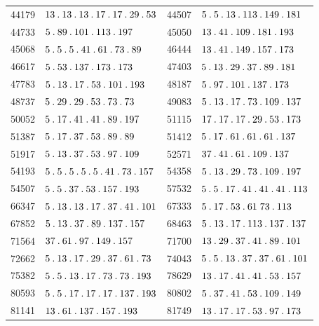 \begin{longtable}{@{}r|l@{\qquad}r|l@{}}
44179 & $13\pdot 13\pdot 13\pdot 17\pdot 17\pdot 29\pdot 53$ & 44507 & $5\pdot 5\pdot 13\pdot 113\pdot 149\pdot 181$\\
44733 & $5\pdot 89\pdot 101\pdot 113\pdot 197$ & 45050 & $13\pdot 41\pdot 109\pdot 181\pdot 193$\\
45068 & $5\pdot 5\pdot 5\pdot 41\pdot 61\pdot 73\pdot 89$ & 46444 & $13\pdot 41\pdot 149\pdot 157\pdot 173$\\
46617 & $5\pdot 53\pdot 137\pdot 173\pdot 173$ & 47403 & $5\pdot 13\pdot 29\pdot 37\pdot 89\pdot 181$\\
47783 & $5\pdot 13\pdot 17\pdot 53\pdot 101\pdot 193$ & 48187 & $5\pdot 97\pdot 101\pdot 137\pdot 173$\\
48737 & $5\pdot 29\pdot 29\pdot 53\pdot 73\pdot 73$ & 49083 & $5\pdot 13\pdot 17\pdot 73\pdot 109\pdot 137$\\
50052 & $5\pdot 17\pdot 41\pdot 41\pdot 89\pdot 197$ & 51115 & $17\pdot 17\pdot 17\pdot 29\pdot 53\pdot 173$\\
51387 & $5\pdot 17\pdot 37\pdot 53\pdot 89\pdot 89$ & 51412 & $5\pdot 17\pdot 61\pdot 61\pdot 61\pdot 137$\\
51917 & $5\pdot 13\pdot 37\pdot 53\pdot 97\pdot 109$ & 52571 & $37\pdot 41\pdot 61\pdot 109\pdot 137$\\
54193 & $5\pdot 5\pdot 5\pdot 5\pdot 5\pdot 41\pdot 73\pdot 157$ & 54358 & $5\pdot 13\pdot 29\pdot 73\pdot 109\pdot 197$\\
54507 & $5\pdot 5\pdot 37\pdot 53\pdot 157\pdot 193$ & 57532 & $5\pdot 5\pdot 17\pdot 41\pdot 41\pdot 41\pdot 113$\\
66347 & $5\pdot 13\pdot 13\pdot 17\pdot 37\pdot 41\pdot 101$ & 67333 & $5\pdot 17\pdot 53\pdot 61\;73\pdot 113$\\
67852 & $5\pdot 13\pdot 37\pdot 89\pdot 137\pdot 157$ & 68463 & $5\pdot 13\pdot 17\pdot 113\pdot 137\pdot 137$\\
71564 & $37\pdot 61\pdot 97\pdot 149\pdot 157$ & 71700 & $13\pdot 29\pdot 37\pdot 41\pdot 89\pdot 101$\\
72662 & $5\pdot 13\pdot 17\pdot 29\pdot 37\pdot 61\pdot 73$ & 74043 & $5\pdot 5\pdot 13\pdot 37\pdot 37\pdot 61\pdot 101$\\
75382 & $5\pdot 5\pdot 13\pdot 17\pdot 73\pdot 73\pdot 193$ & 78629 & $13\pdot 17\pdot 41\pdot 41\pdot 53\pdot 157$\\
80593 & $5\pdot 5\pdot 17\pdot 17\pdot 17\pdot 137\pdot 193$ & 80802 & $5\pdot 37\pdot 41\pdot 53\pdot 109\pdot 149$\\
81141 & $13\pdot 61\pdot 137\pdot 157\pdot 193$ & 81749 & $13\pdot 17\pdot 17\pdot 53\pdot 97\pdot 173$\\

\end{longtable}
